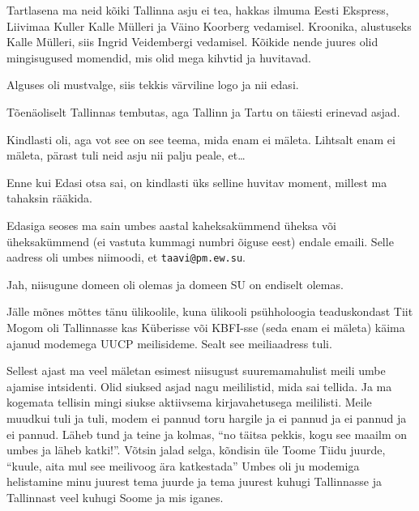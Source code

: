 Tartlasena ma neid kõiki Tallinna asju ei tea, hakkas ilmuma Eesti Ekspress, 
Liivimaa Kuller Kalle Mülleri ja Väino 
Koorberg vedamisel. Kroonika, alustuseks Kalle 
Mülleri, siis Ingrid Veidembergi vedamisel. 
Kõikide nende juures olid mingisugused momendid, mis olid mega kihvtid ja 
huvitavad. 

Alguses oli mustvalge, siis tekkis värviline logo ja nii edasi.


Tõenäoliselt Tallinnas tembutas, aga Tallinn ja Tartu on täiesti erinevad asjad.


Kindlasti oli, aga vot see on see teema, mida enam ei mäleta. Lihtsalt enam ei 
mäleta, pärast tuli neid asju nii palju peale, et\ldots


Enne kui Edasi otsa sai, on kindlasti üks selline huvitav moment, millest ma 
tahaksin rääkida. 

Edasiga seoses ma sain umbes aastal kaheksakümmend üheksa või üheksakümmend (ei 
vastuta kummagi numbri õiguse eest) endale emaili. Selle aadress oli umbes 
niimoodi, et \verb|taavi@pm.ew.su|.


Jah, niisugune domeen oli olemas ja domeen SU on endiselt olemas.


Jälle mõnes mõttes tänu ülikoolile, kuna ülikooli psühholoogia 
teaduskondast Tiit 
Mogom oli Tallinnasse kas Küberisse või 
KBFI-sse (seda enam ei mäleta) käima ajanud  modemega UUCP 
meilisideme. Sealt see meiliaadress tuli. 

Sellest ajast ma veel mäletan esimest niisugust suuremamahulist meili umbe 
ajamise intsidenti. Olid siuksed asjad nagu meililistid, mida sai tellida. Ja 
ma kogemata tellisin mingi siukse aktiivsema kirjavahetusega meililisti. Meile 
muudkui tuli ja tuli, modem ei pannud toru hargile ja ei pannud ja ei pannud ja 
ei pannud. Läheb tund ja teine ja kolmas, \enquote{no täitsa pekkis, kogu see 
maailm on umbes ja läheb katki!}.  Võtsin jalad selga, kõndisin üle Toome 
Tiidu juurde, \enquote{kuule, aita mul see meilivoog 
ära katkestada} Umbes oli ju modemiga helistamine minu juurest tema juurde ja 
tema juurest kuhugi Tallinnasse ja Tallinnast veel kuhugi Soome ja mis iganes.

